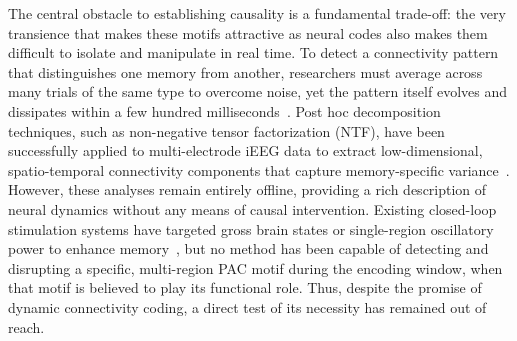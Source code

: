 \documentclass{article}
\begin{document}
The central obstacle to establishing causality is a fundamental trade-off: the very transience that makes these motifs attractive as neural codes also makes them difficult to isolate and manipulate in real time. To detect a connectivity pattern that distinguishes one memory from another, researchers must average across many trials of the same type to overcome noise, yet the pattern itself evolves and dissipates within a few hundred milliseconds~\cite{paz2022dynamic}. Post hoc decomposition techniques, such as non-negative tensor factorization (NTF), have been successfully applied to multi-electrode iEEG data to extract low-dimensional, spatio-temporal connectivity components that capture memory-specific variance~\cite{cichocki2015tensor}. However, these analyses remain entirely offline, providing a rich description of neural dynamics without any means of causal intervention. Existing closed-loop stimulation systems have targeted gross brain states or single-region oscillatory power to enhance memory~\cite{ezzyat2017closed}, but no method has been capable of detecting and disrupting a specific, multi-region PAC motif during the encoding window, when that motif is believed to play its functional role. Thus, despite the promise of dynamic connectivity coding, a direct test of its necessity has remained out of reach.
\end{document}
